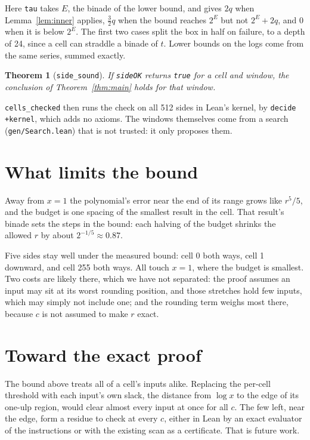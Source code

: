 \documentclass[11pt]{article}
\newtheorem{theorem}{Theorem}
\newcommand{\lean}[1]{{\small\texttt{#1}}}
\begin{document}
Here \lean{tau} takes $E$, the binade of the lower bound, and gives $2q$ when
Lemma~\ref{lem:inner} applies, $\tfrac32 q$ when the bound reaches $2^E$ but not $2^E + 2q$,
and $0$ when it is below $2^E$. The first two cases split the box in half on failure, to a
depth of 24, since a cell can straddle a binade of $t$. Lower bounds on the logs
come from the same series, summed exactly.

\begin{theorem}[\lean{side\_sound}]
If \lean{sideOK} returns \lean{true} for a cell and window, the conclusion of
Theorem~\ref{thm:main} holds for that window.
\end{theorem}

\lean{cells\_checked} then runs the check on all 512 sides in Lean's kernel, by
\lean{decide +kernel}, which adds no axioms. The windows themselves come from a search
(\lean{gen/Search.lean}) that is not trusted: it only proposes them.

\section{What limits the bound}\label{sec:limits}

Away from $x = 1$ the polynomial's error near the end of its range grows like $r^5/5$, and
the budget is one spacing of the smallest result in the cell. That result's binade sets the
steps in the bound: each halving of the budget shrinks the allowed $r$ by about
$2^{-1/5} \approx 0.87$.

Five sides stay well under the measured bound: cell 0 both ways, cell 1 downward, and
cell 255 both ways. All touch $x = 1$, where the budget is smallest. Two costs are likely
there, which we have not separated: the proof assumes an input may sit at its worst
rounding position, and those stretches hold few inputs, which may simply not include one;
and the rounding term weighs most there, because $c$ is not assumed to make $r$ exact.

\section{Toward the exact proof}\label{sec:exact}

The bound above treats all of a cell's inputs alike. Replacing the per-cell threshold with
each input's own slack, the distance from $\log x$ to the edge of its one-ulp region, would
clear almost every input at once for all $c$. The few left, near the edge, form a residue to
check at every $c$, either in Lean by an exact evaluator of the instructions or with the
existing scan as a certificate. That is future work.
\end{document}
